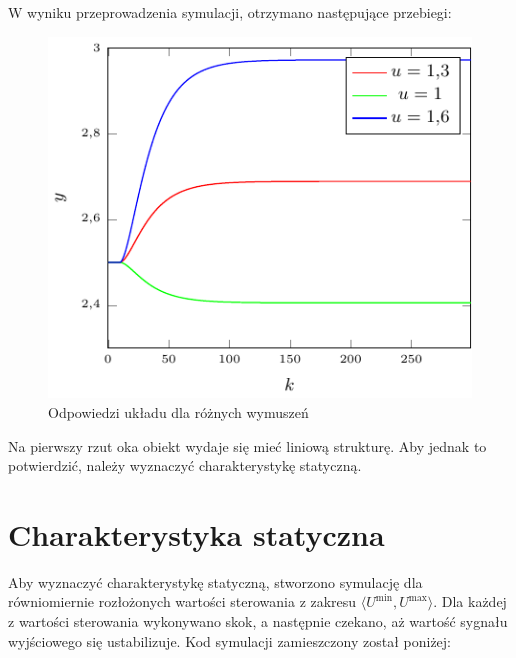 W wyniku przeprowadzenia symulacji, otrzymano następujące przebiegi:
\begin{figure}[h] 
\centering 
\includegraphics[scale=1.4]{wykresy/zad1_2/2_1.pdf} 
\caption{Odpowiedzi układu dla różnych wymuszeń} 
\end{figure}

\par Na pierwszy rzut oka obiekt wydaje się mieć liniową strukturę. Aby jednak to potwierdzić, należy wyznaczyć charakterystykę statyczną.


\section{Charakterystyka statyczna}
Aby wyznaczyć charakterystykę statyczną, stworzono symulację dla równiomiernie rozłożonych wartości sterowania z zakresu $ \langle  U^{\textrm{min}}, U^{\textrm{max}}\rangle $. Dla każdej z wartości sterowania wykonywano skok, a następnie czekano, aż wartość sygnału wyjściowego się ustabilizuje. Kod symulacji zamieszczony został poniżej:

